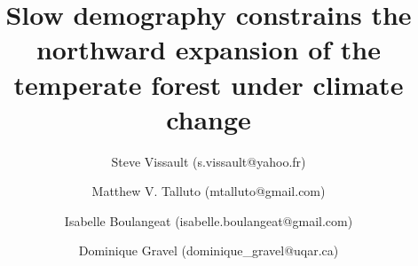 \usepackage[margin=1in]{geometry}

\usepackage[T1]{fontenc}
\usepackage[utf8]{inputenc}

\usepackage{amsmath} %
\usepackage{amssymb}
\usepackage{amsthm}

\usepackage{setspace}
\usepackage[square,sort,comma,numbers]{natbib}


\onehalfspace

\usepackage{microtype}
\usepackage{lipsum}

\usepackage{caption}
\usepackage{subcaption}

\setlength{\columnsep}{1cm}

\usepackage{titling} %
\pretitle{\begin{flushleft}\Large}
\posttitle{\end{flushleft}}
\predate{}
\postdate{}
\preauthor{\begin{flushleft}}
\postauthor{\end{flushleft}}
\setlength{\droptitle}{-3em}

\setlength{\parskip}{0.5em}

\usepackage{authblk} %
\renewcommand\Authsep{\protect\\}
\renewcommand\Authands{\protect\\}

\usepackage{graphicx}
\captionsetup{labelformat=simple} %
\usepackage{booktabs}
\usepackage[flushleft]{threeparttable}
\usepackage{geometry}

\usepackage{tikz}
\usepackage{pgfplots}
\usepackage{pgfplotstable}
\usepackage{xcolor}
\usetikzlibrary{shapes, arrows, positioning}

%
%


\title{Slow demography constrains the northward expansion of the temperate forest under climate change}


\date{}
\author[1,*]{Steve Vissault (s.vissault@yahoo.fr)}
\author[1,2]{Matthew V. Talluto (mtalluto@gmail.com)}
\author[1]{Isabelle Boulangeat (isabelle.boulangeat@gmail.com)}
\author[1]{Dominique Gravel (dominique\_gravel@uqar.ca)}



